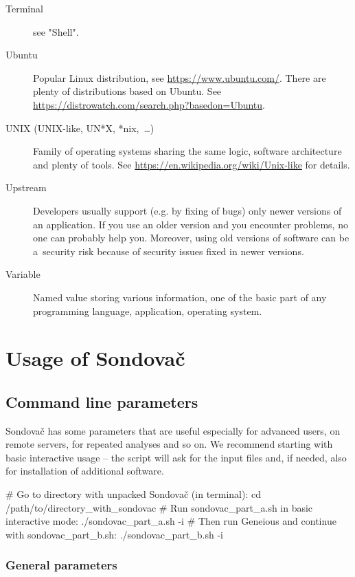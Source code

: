 \documentclass[a4paper, 11pt, twoside]{article}
\begin{document}
\begin{description}
  \item[Terminal] see "Shell".
  \item[Ubuntu] Popular Linux distribution, see \url{https://www.ubuntu.com/}. There are plenty of distributions based on Ubuntu. See \url{https://distrowatch.com/search.php?basedon=Ubuntu}.
  \item[UNIX (UNIX-like, UN*X, *nix,~\ldots)] Family of operating systems sharing the same logic, software architecture and plenty of tools. See \url{https://en.wikipedia.org/wiki/Unix-like} for details.
  \item[Upstream] Developers usually support (e.g. by fixing of bugs) only newer versions of an application. If you use an older version and you encounter problems, no one can probably help you. Moreover, using old versions of software can be a~security risk because of security issues fixed in newer versions.
  \item[Variable] Named value storing various information, one of the basic part of any programming language, application, operating system.
\end{description}

\section{Usage of Sondovač}
\label{script-usage}

\subsection{Command line parameters}

Sondovač has some parameters that are useful especially for advanced users, on remote servers, for repeated analyses and so on. We recommend starting with basic interactive usage -- the script will ask for the input files and, if needed, also for installation of additional software.

\begin{bashcode}
  # Go to directory with unpacked Sondovač (in terminal):
  cd /path/to/directory_with_sondovac
  # Run sondovac_part_a.sh in basic interactive mode:
  ./sondovac_part_a.sh -i
  # Then run Geneious and continue with sondovac_part_b.sh:
  ./sondovac_part_b.sh -i
\end{bashcode}

\subsubsection{General parameters}
\end{document}
